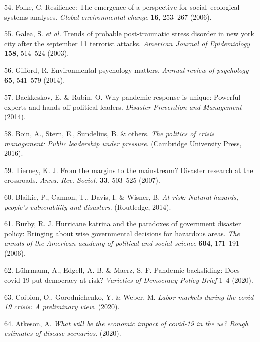 \documentclass[]{article}
\begin{document}
\leavevmode\hypertarget{ref-folke2006resilience}{}%
54. Folke, C. Resilience: The emergence of a perspective for social--ecological systems analyses. \emph{Global environmental change} \textbf{16}, 253--267 (2006).

\leavevmode\hypertarget{ref-galea2003trends}{}%
55. Galea, S. \emph{et al.} Trends of probable post-traumatic stress disorder in new york city after the september 11 terrorist attacks. \emph{American Journal of Epidemiology} \textbf{158}, 514--524 (2003).

\leavevmode\hypertarget{ref-gifford2014environmental}{}%
56. Gifford, R. Environmental psychology matters. \emph{Annual review of psychology} \textbf{65}, 541--579 (2014).

\leavevmode\hypertarget{ref-baekkeskov2014pandemic}{}%
57. Baekkeskov, E. \& Rubin, O. Why pandemic response is unique: Powerful experts and hands-off political leaders. \emph{Disaster Prevention and Management} (2014).

\leavevmode\hypertarget{ref-boin2016politics}{}%
58. Boin, A., Stern, E., Sundelius, B. \& others. \emph{The politics of crisis management: Public leadership under pressure}. (Cambridge University Press, 2016).

\leavevmode\hypertarget{ref-tierney2007margins}{}%
59. Tierney, K. J. From the margins to the mainstream? Disaster research at the crossroads. \emph{Annu. Rev. Sociol.} \textbf{33}, 503--525 (2007).

\leavevmode\hypertarget{ref-blaikie2014risk}{}%
60. Blaikie, P., Cannon, T., Davis, I. \& Wisner, B. \emph{At risk: Natural hazards, people's vulnerability and disasters}. (Routledge, 2014).

\leavevmode\hypertarget{ref-burby2006hurricane}{}%
61. Burby, R. J. Hurricane katrina and the paradoxes of government disaster policy: Bringing about wise governmental decisions for hazardous areas. \emph{The annals of the American academy of political and social science} \textbf{604}, 171--191 (2006).

\leavevmode\hypertarget{ref-luhrmann2020}{}%
62. Lührmann, A., Edgell, A. B. \& Maerz, S. F. Pandemic backsliding: Does covid-19 put democracy at risk? \emph{Varieties of Democracy Policy Brief} 1--4 (2020).

\leavevmode\hypertarget{ref-coibion2020labor}{}%
63. Coibion, O., Gorodnichenko, Y. \& Weber, M. \emph{Labor markets during the covid-19 crisis: A preliminary view}. (2020).

\leavevmode\hypertarget{ref-atkeson2020will}{}%
64. Atkeson, A. \emph{What will be the economic impact of covid-19 in the us? Rough estimates of disease scenarios}. (2020).
\end{document}
